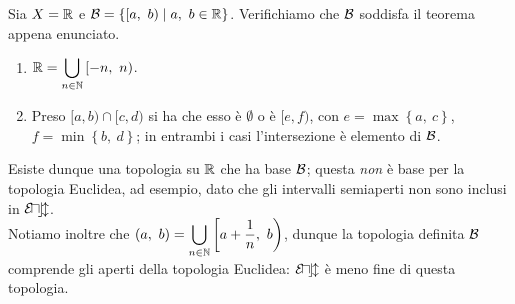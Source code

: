 \begin{example}
Sia $X=\mathbb{R}$ e $\basis=\left\{[a,\ b)\mid a,\ b\in\realset\right\}$. Verifichiamo che $\mathcal{B}$ soddisfa il teorema appena enunciato.
\begin{enumerate}
\item $\displaystyle\mathbb{R}=\mathop{{\bigcup}}\displaylimits_{n\in \mathbb{N}}\left[-n,\ n\right)$.
\item Preso $[a, b)\cap[c, d)$ si ha che esso è $\emptyset$ o è $[e, f)$, con $e=\max\left\{a,\ c\right\}$, $f=\min\left\{b,\ d\right\}$; in entrambi i casi l'intersezione è elemento di $\mathcal{B}$.
\end{enumerate}
Esiste dunque una topologia su $\mathbb{R}$ che ha base $\mathcal{B}$; questa \textit{non} è base per la topologia Euclidea, ad esempio, dato che gli intervalli semiaperti non sono inclusi in $\mathcal{E\! u\! c\! l}$.\\
Notiamo inoltre che $\displaystyle\left(a,\ b\right)=\union_{n\in \naturalset}\left[a+\frac{1}{n},\ b\right)$, dunque la topologia definita $\mathcal{B}$ comprende gli aperti della topologia Euclidea: $\mathcal{E\! u\! c\! l}$ è meno fine di questa topologia.
\end{example}
